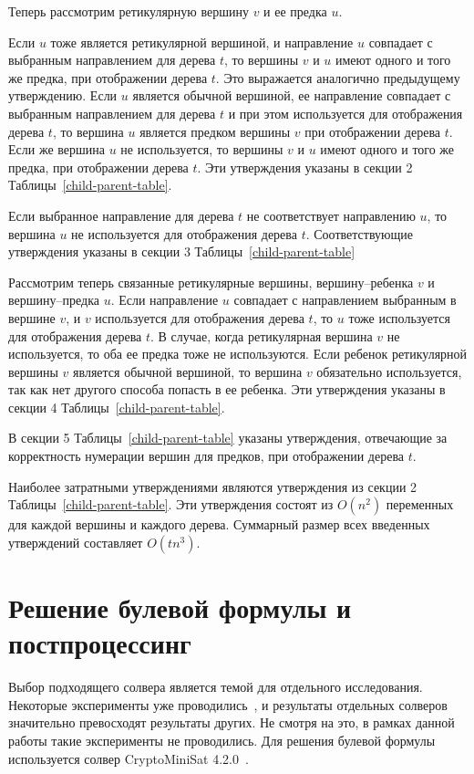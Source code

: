 Теперь рассмотрим ретикулярную вершину $v$ и ее предка $u$.

Если $u$ тоже является ретикулярной вершиной, и направление $u$ совпадает с выбранным направлением для дерева $t$, то вершины $v$ и $u$ имеют одного и того же предка, при отображении дерева $t$.
Это выражается аналогично предыдущему утверждению.
Если $u$ является обычной вершиной, ее направление совпадает с выбранным направлением для дерева $t$ и при этом используется для отображения дерева $t$, то вершина $u$ является предком вершины $v$ при отображении дерева $t$.
Если же вершина $u$ не используется, то вершины $v$ и $u$ имеют одного и того же предка, при отображении дерева $t$.
Эти утверждения указаны в секции 2 Таблицы~\ref{child-parent-table}.

Если выбранное направление для дерева $t$ не соответствует направлению $u$, то вершина $u$ не используется для отображения дерева $t$.
Соответствующие утверждения указаны в секции 3 Таблицы~\ref{child-parent-table}

Рассмотрим теперь связанные ретикулярные вершины, вершину--ребенка $v$ и вершину--предка $u$.
Если направление $u$ совпадает с направлением выбранным в вершине $v$, и $v$ используется для отображения дерева $t$, то $u$ тоже используется для отображения дерева $t$.
В случае, когда ретикулярная вершина $v$ не используется, то оба ее предка тоже не используются.
Если ребенок ретикулярной вершины $v$ является обычной вершиной, то вершина $v$ обязательно используется, так как нет другого способа попасть в ее ребенка.
Эти утверждения указаны в секции 4 Таблицы~\ref{child-parent-table}.

В секции 5 Таблицы~\ref{child-parent-table} указаны утверждения, отвечающие за корректность нумерации вершин для предков, при отображении дерева $t$.

Наиболее затратными утверждениями являются утверждения из секции 2 Таблицы~\ref{child-parent-table}.
Эти утверждения состоят из $O(n^2)$ переменных для каждой вершины и каждого дерева.
Суммарный размер всех введенных утверждений составляет $O(tn^3)$.

\FloatBarrier
\section{Решение булевой формулы и постпроцессинг}

Выбор подходящего солвера является темой для отдельного исследования. Некоторые эксперименты уже проводились~\cite{bonet2009efficiently}, и результаты отдельных солверов значительно превосходят результаты других. Не смотря на это, в рамках данной работы такие эксперименты не проводились. Для решения булевой формулы используется солвер CryptoMiniSat 4.2.0~\cite{cryptominisat}.

